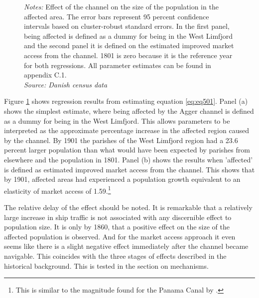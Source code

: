 \documentclass[11pt]{article}
\begin{document}
\begin{figure}[h]
\begin{subfigure}[b]{0.8\textwidth}
    \end{subfigure}
    \parbox{1\textwidth}{
    \caption*{\footnotesize \textit{Notes:} Effect of the channel on the size of the population in the affected area. The error bars represent 95 percent confidence intervals based on cluster-robust standard errors. In the first panel, being affected is defined as a dummy for being in the West Limfjord and the second panel it is defined on the estimated improved market access from the channel. 1801 is zero because it is the reference year for both regressions. All parameter estimates can be found in appendix C.1. \\ \textit{Source: Danish census data}}
} \label{fig:pop1}
\end{figure}

Figure \ref{fig:pop1} shows regression results from estimating equation \ref{eq:eq501}. Panel (a) shows the simplest estimate, where being affected by the Agger channel is defined as a dummy for being in the West Limfjord. This allows parameters to be interpreted as the approximate percentage increase in the affected region caused by the channel. By 1901 the parishes of the West Limfjord region had a 23.6 percent larger population than what would have been expected by parishes from elsewhere and the population in 1801. Panel (b) shows the results when 'affected' is defined as estimated improved market access from the channel. This shows that by 1901, affected areas had experienced a population growth equivalent to an elasticity of market access of 1.59.\footnote{This is similar to the magnitude found for the Panama Canal by \cite{rauch2022a}.}

The relative delay of the effect should be noted. It is remarkable that a relatively large increase in ship traffic is not associated with any discernible effect to population size. It is only by 1860, that a positive effect on the size of the affected population is observed. And for the market access approach it even seems like there is a slight negative effect immediately after the channel became navigable. This coincides with the three stages of effects described in the historical background. This is tested in the section on mechanisms. 
\end{document}
